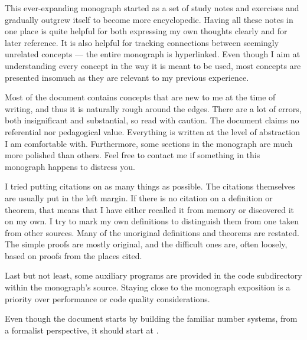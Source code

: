 
This ever-expanding monograph started as a set of study notes and exercises and gradually outgrew itself to become more encyclopedic. Having all these notes in one place is quite helpful for both expressing my own thoughts clearly and for later reference. It is also helpful for tracking connections between seemingly unrelated concepts --- the entire monograph is hyperlinked. Even though I aim at understanding every concept in the way it is meant to be used, most concepts are presented insomuch as they are relevant to my previous experience.

Most of the document contains concepts that are new to me at the time of writing, and thus it is naturally rough around the edges. There are a lot of errors, both insignificant and substantial, so read with caution. The document claims no referential nor pedagogical value. Everything is written at the level of abstraction I am comfortable with. Furthermore, some sections in the monograph are much more polished than others. Feel free to contact me if something in this monograph happens to distress you.

I tried putting citations on as many things as possible. The citations themselves are usually put in the left margin. If there is no citation on a definition or theorem, that means that I have either recalled it from memory or discovered it on my own. I try to mark my own definitions to distinguish them from one taken from other sources. Many of the unoriginal definitions and theorems are restated. The simple proofs are mostly original, and the difficult ones are, often loosely, based on proofs from the places cited.

Last but not least, some auxiliary programs are provided in the code subdirectory within the monograph's source. Staying close to the monograph exposition is a priority over performance or code quality considerations.

Even though the document starts by building the familiar number systems, from a formalist perspective, it should start at .

